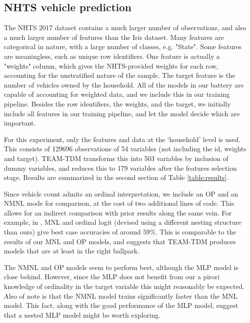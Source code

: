 \documentclass[conference]{IEEEtran}
\begin{document}
\subsection{NHTS vehicle prediction}\label{subsection:vehicle}

The NHTS 2017 dataset contains a much larger number of observations, and also a much larger number of features than the Iris dataset.
 Many features are categorical in nature, with a large number of classes, e.g. "State".
 Some features are meaningless, such as unique row identifiers.
 One feature is actually a "weights" column, which gives the NHTS-provided weights for each row, accounting for the unstratified nature of the sample.
 The target feature is the number of vehicles owned by the household.
 All of the models in our battery are capable of accounting for weighted data, and we include this in our training pipeline.
 Besides the row identifiers, the weights, and the target, we initially include all features in our training pipeline, and let the model decide which are important.
 
For this experiment, only the features and data at the `household' level is used.
 This consists of 129696 observations of 54 variables (not including the id, weights and target).
 TEAM-TDM transforms this into 503 variables by inclusion of dummy variables, and reduces this to 179 variables after the features selection stage.
 Results are summarized in the second section of Table \ref{table:results}.

Since vehicle count admits an ordinal interpretation, we include an OP and an NMNL mode for comparison, at the cost of two additional lines of code.
 This allows for an indirect comparison with prior results along the same vein.
 For example, in \cite{bhat1998comparison}, MNL and ordinal logit (devised using a different nesting structure than ours) give best case accuracies of around $59\%$.
 This is comparable to the results of our MNL and OP models, and suggests that TEAM-TDM produces models that are at least in the right ballpark.

The NMNL and OP models seem to perform best, although the MLP model is close behind.
 However, since the MLP does not benefit from our a pirori knowledge of ordinality in the target variable this might reasonably be expected.
 Also of note is that the NMNL model trains significantly faster than the MNL model.
 This fact, along with the good performance of the MLP model, suggest that a nested MLP model might be worth exploring.
\end{document}

